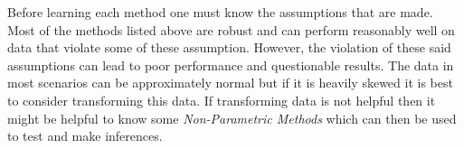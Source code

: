 \documentclass[11pt]{article}
\begin{document}
Before learning each method one must know the assumptions that are made. Most of the methods listed above are robust and can perform reasonably well on data that violate some of these assumption. However, the violation of these said assumptions can lead to poor performance and questionable results. The data in most scenarios can be approximately normal but if it is heavily skewed it is best to consider transforming this data. If transforming data is not helpful then it might be helpful to know some \textit{Non-Parametric Methods} which can then be used to test and make inferences.
\end{document}
